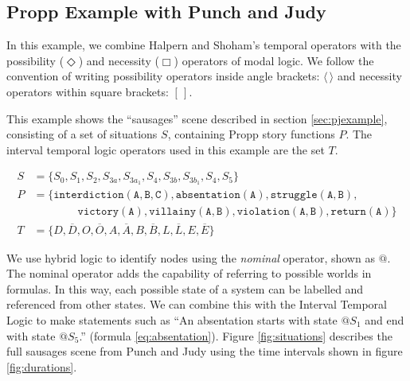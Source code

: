 \documentclass{llncs}
\begin{document}
\subsection{Propp Example with Punch and Judy}

In this example, we combine Halpern and Shoham's temporal operators with the possibility ($\Diamond$) and necessity ($\Box$) operators of modal logic. We follow the convention of writing possibility operators inside angle brackets: $\langle \, \rangle$ and necessity operators within square brackets: $[ \, ]$.

This example shows the ``sausages'' scene described in section \ref{sec:pjexample}, consisting of a set of situations $S$, containing Propp story functions $P$. The interval temporal logic operators used in this example are the set $T$.

\begin{align}
    S &= \{S_0, S_1, S_2, S_{3a}, S_{3a_1}, S_4, S_{3b}, S_{3b_1}, S_4, S_5\}\\
    P &= \{\mathtt{interdiction(A, B, C), absentation(A), struggle(A, B),}\nonumber\\
  &\qquad\qquad\mathtt{victory(A), villainy(A, B), violation(A, B), return(A)}\}\\
  T &= \{D, \overline{D}, O, \overline{O}, A, \overline{A}, B, \overline{B}, L, \overline{L}, E, \overline{E}\}
\end{align}

We use hybrid logic to identify nodes using the \emph{nominal} operator, shown as $@$. The nominal operator adds the capability of referring to possible worlds in formulas. In this way, each possible state of a system can be labelled and referenced from other states.
We can combine this with the Interval Temporal Logic to make statements such as ``An absentation starts with state $@S_1$ and end with state $@S_5$.'' (formula \ref{eq:absentation}).
Figure \ref{fig:situations} describes the full sausages scene from Punch and Judy using the time intervals shown in figure \ref{fig:durations}.
\end{document}
